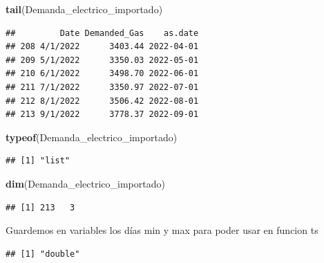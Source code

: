 \documentclass[
]{article}
\newenvironment{Shaded}{\begin{snugshade}}{\end{snugshade}}
\newcommand{\AttributeTok}[1]{\textcolor[rgb]{0.13,0.29,0.53}{#1}}
\newcommand{\FunctionTok}[1]{\textcolor[rgb]{0.13,0.29,0.53}{\textbf{#1}}}
\newcommand{\NormalTok}[1]{#1}
\newcommand{\OtherTok}[1]{\textcolor[rgb]{0.56,0.35,0.01}{#1}}
\newcommand{\SpecialCharTok}[1]{\textcolor[rgb]{0.81,0.36,0.00}{\textbf{#1}}}
\begin{document}
\begin{Shaded}
\begin{Highlighting}[]
\FunctionTok{tail}\NormalTok{(Demanda\_electrico\_importado)}
\end{Highlighting}
\end{Shaded}

\begin{verbatim}
##         Date Demanded_Gas    as.date
## 208 4/1/2022      3403.44 2022-04-01
## 209 5/1/2022      3350.03 2022-05-01
## 210 6/1/2022      3498.70 2022-06-01
## 211 7/1/2022      3350.97 2022-07-01
## 212 8/1/2022      3506.42 2022-08-01
## 213 9/1/2022      3778.37 2022-09-01
\end{verbatim}

\begin{Shaded}
\begin{Highlighting}[]
\FunctionTok{typeof}\NormalTok{(Demanda\_electrico\_importado)}
\end{Highlighting}
\end{Shaded}

\begin{verbatim}
## [1] "list"
\end{verbatim}

\begin{Shaded}
\begin{Highlighting}[]
\FunctionTok{dim}\NormalTok{(Demanda\_electrico\_importado)}
\end{Highlighting}
\end{Shaded}

\begin{verbatim}
## [1] 213   3
\end{verbatim}

Guardemos en variables los días min y max para poder usar en funcion ts

\begin{Shaded}
\end{Shaded}

\begin{verbatim}
## [1] "double"
\end{verbatim}

\begin{Shaded}
\end{Shaded}
\end{document}
